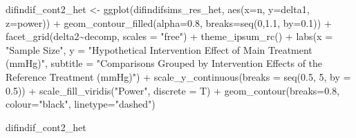 \documentclass[
]{article}
\newenvironment{Shaded}{\begin{snugshade}}{\end{snugshade}}
\newcommand{\AttributeTok}[1]{\textcolor[rgb]{0.77,0.63,0.00}{#1}}
\newcommand{\DecValTok}[1]{\textcolor[rgb]{0.00,0.00,0.81}{#1}}
\newcommand{\FloatTok}[1]{\textcolor[rgb]{0.00,0.00,0.81}{#1}}
\newcommand{\FunctionTok}[1]{\textcolor[rgb]{0.00,0.00,0.00}{#1}}
\newcommand{\NormalTok}[1]{#1}
\newcommand{\OtherTok}[1]{\textcolor[rgb]{0.56,0.35,0.01}{#1}}
\newcommand{\SpecialCharTok}[1]{\textcolor[rgb]{0.00,0.00,0.00}{#1}}
\newcommand{\StringTok}[1]{\textcolor[rgb]{0.31,0.60,0.02}{#1}}
\begin{document}
\begin{Shaded}
\begin{Highlighting}[]
\NormalTok{difindif\_cont2\_het }\OtherTok{\textless{}{-}} \FunctionTok{ggplot}\NormalTok{(difindifsims\_res\_het, }\FunctionTok{aes}\NormalTok{(}\AttributeTok{x=}\NormalTok{n, }\AttributeTok{y=}\NormalTok{delta1, }\AttributeTok{z=}\NormalTok{power)) }\SpecialCharTok{+}
  \FunctionTok{geom\_contour\_filled}\NormalTok{(}\AttributeTok{alpha=}\FloatTok{0.8}\NormalTok{, }\AttributeTok{breaks=}\FunctionTok{seq}\NormalTok{(}\DecValTok{0}\NormalTok{,}\FloatTok{1.1}\NormalTok{, }\AttributeTok{by=}\FloatTok{0.1}\NormalTok{)) }\SpecialCharTok{+}
  \FunctionTok{facet\_grid}\NormalTok{(delta2}\SpecialCharTok{\textasciitilde{}}\NormalTok{decomp, }\AttributeTok{scales =} \StringTok{"free"}\NormalTok{) }\SpecialCharTok{+}
  \FunctionTok{theme\_ipsum\_rc}\NormalTok{() }\SpecialCharTok{+}
  \FunctionTok{labs}\NormalTok{(}\AttributeTok{x =} \StringTok{"Sample Size"}\NormalTok{,}
       \AttributeTok{y =} \StringTok{"Hypothetical Intervention Effect of Main Treatment (mmHg)"}\NormalTok{,}
       \AttributeTok{subtitle =} \StringTok{"Comparisons Grouped by Intervention Effects of the Reference Treatment (mmHg)"}\NormalTok{) }\SpecialCharTok{+}
  \FunctionTok{scale\_y\_continuous}\NormalTok{(}\AttributeTok{breaks =} \FunctionTok{seq}\NormalTok{(}\FloatTok{0.5}\NormalTok{, }\DecValTok{5}\NormalTok{, }\AttributeTok{by =} \FloatTok{0.5}\NormalTok{)) }\SpecialCharTok{+}
  \FunctionTok{scale\_fill\_viridis}\NormalTok{(}\StringTok{"Power"}\NormalTok{, }\AttributeTok{discrete =}\NormalTok{ T) }\SpecialCharTok{+}
  \FunctionTok{geom\_contour}\NormalTok{(}\AttributeTok{breaks=}\FloatTok{0.8}\NormalTok{, }\AttributeTok{colour=}\StringTok{"black"}\NormalTok{, }\AttributeTok{linetype=}\StringTok{"dashed"}\NormalTok{)    }

\NormalTok{difindif\_cont2\_het}
\end{Highlighting}
\end{Shaded}
\end{document}
